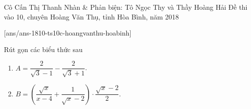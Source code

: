 \begin{name}
	{Cô Cấn Thị Thanh Nhàn \& Phản biện: Tô Ngọc Thy và Thầy Hoàng Hải}
	{Đề thi vào 10, chuyên Hoàng Văn Thụ, tỉnh Hòa Bình, năm 2018}
\end{name}
\setcounter{ex}{0}
[ans/ans-1810-ts10c-hoangvanthu-hoabinh]
\begin{ex}%
	Rút gọn các biểu thức sau
	\begin{enumerate}
		\item $A=\dfrac{2}{\sqrt{3}-1}-\dfrac{2}{\sqrt{3}+1}$.
		\item $B= \left(\dfrac{\sqrt{x}}{x-4}+\dfrac{1}{\sqrt{x}-2}\right)\cdot\dfrac{\sqrt{x}-2}{2}$.
	\end{enumerate}
\end{ex}

